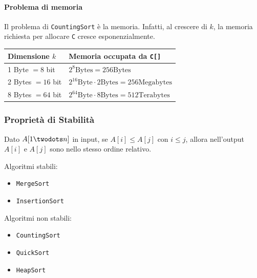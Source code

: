 \paragraph{Problema di memoria} Il problema di \texttt{CountingSort} è la memoria. 
Infatti, al crescere di $k$, la memoria richiesta per allocare \texttt{C} cresce esponenzialmente.
\begin{center}
    \begin{tabular}{|l|l|}
        \hline
        Dimensione $k$ & Memoria occupata da \texttt{C[]} \\
        \hline
        1 Byte $= 8$ bit & $2^8 \text{Bytes} = 256 \text{Bytes}$ \\
        2 Bytes $= 16$ bit & $2^{16} \text{Byte} \cdot 2 \text{Bytes} = 256 \text{Megabytes}$ \\
        8 Bytes $= 64$ bit & $2^{64} \text{Byte} \cdot 8 \text{Bytes} = 512 \text{Terabytes}$ \\
        \hline
    \end{tabular}
\end{center}

\subsubsection{Proprietà di Stabilità}
Dato $A[1 \twodots n]$ in input, se $A[i] \leq A[j]$ con $i \leq j$, allora nell'output $A[i]$ e $A[j]$ sono nello stesso ordine relativo.
\bigskip

Algoritmi stabili:
\begin{itemize}
	\item \texttt{MergeSort}
	\item \texttt{InsertionSort}
\end{itemize}
\bigskip

Algoritmi non stabili:
\begin{itemize}
	\item \texttt{CountingSort}
	\item \texttt{QuickSort}
	\item \texttt{HeapSort}
\end{itemize}
